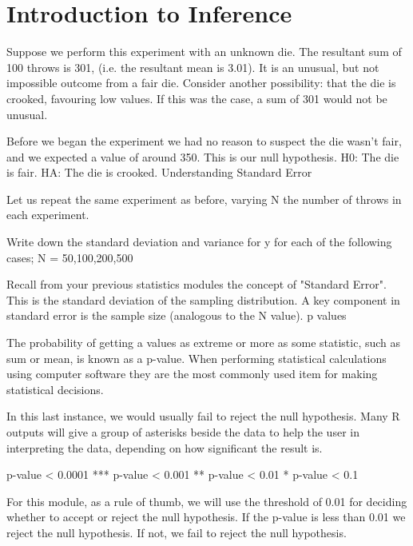\section{Introduction to Inference}

Suppose we perform this experiment with an unknown die. The resultant sum of 100 throws is 301, (i.e. the resultant mean is 3.01). 
It is an unusual, but not impossible outcome from a fair die.
Consider another possibility: that the die is crooked, favouring low values. If this was the case, a sum of 301 would not be unusual.

Before we began the experiment we had no reason to suspect the die wasn't fair, and we expected a value of around 350. This is our null hypothesis.
H0: The die is fair.
HA: The die is crooked.
Understanding Standard Error

Let us repeat the same experiment as before, varying N the number of throws in each experiment.

Write down the standard deviation and variance for y for each of the following cases; N = 50,100,200,500

Recall from your previous statistics modules the concept of "Standard Error". This is the standard deviation of the sampling distribution. A key component in standard error is the sample size (analogous to the N value).
p values

The probability of getting a values as extreme or more as some statistic, such as sum or mean, is known as a p-value. When performing statistical calculations using computer software they are the most commonly used item for making statistical decisions.



In this last instance, we would usually fail to reject the null hypothesis. Many R outputs will give a group of asterisks beside the data to help the user in interpreting the data, depending on how significant the result is.

p-value  < 0.0001  	***
p-value  < 0.001	**
p-value  < 0.01	*
p-value  < 0.1

For this module, as a rule of thumb, we will use the threshold of 0.01 for deciding whether to accept or reject the null hypothesis. If the p-value is less than 0.01 we reject the null hypothesis. If not, we fail to reject the null hypothesis.


